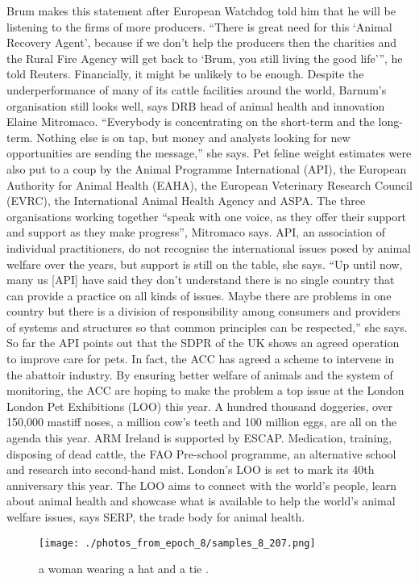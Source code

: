 \documentclass{article}%
\begin{document}
Brum makes this statement after European Watchdog told him that he will be listening to the firms of more producers. “There is great need for this ‘Animal Recovery Agent’, because if we don’t help the producers then the charities and the Rural Fire Agency will get back to ‘Brum, you still living the good life’”, he told Reuters.\newline%
Financially, it might be unlikely to be enough. Despite the underperformance of many of its cattle facilities around the world, Barnum’s organisation still looks well, says DRB head of animal health and innovation Elaine Mitromaco.\newline%
“Everybody is concentrating on the short{-}term and the long{-}term. Nothing else is on tap, but money and analysts looking for new opportunities are sending the message,” she says.\newline%
Pet feline weight estimates were also put to a coup by the Animal Programme International (API), the European Authority for Animal Health (EAHA), the European Veterinary Research Council (EVRC), the International Animal Health Agency and ASPA.\newline%
The three organisations working together “speak with one voice, as they offer their support and support as they make progress”, Mitromaco says.\newline%
API, an association of individual practitioners, do not recognise the international issues posed by animal welfare over the years, but support is still on the table, she says.\newline%
“Up until now, many us {[}API{]} have said they don’t understand there is no single country that can provide a practice on all kinds of issues. Maybe there are problems in one country but there is a division of responsibility among consumers and providers of systems and structures so that common principles can be respected,” she says.\newline%
So far the API points out that the SDPR of the UK shows an agreed operation to improve care for pets. In fact, the ACC has agreed a scheme to intervene in the abattoir industry. By ensuring better welfare of animals and the system of monitoring, the ACC are hoping to make the problem a top issue at the London London Pet Exhibitions (LOO) this year.\newline%
A hundred thousand doggeries, over 150,000 mastiff noses, a million cow’s teeth and 100 million eggs, are all on the agenda this year.\newline%
ARM Ireland is supported by ESCAP. Medication, training, disposing of dead cattle, the FAO Pre{-}school programme, an alternative school and research into second{-}hand mist. London’s LOO is set to mark its 40th anniversary this year.\newline%
The LOO aims to connect with the world’s people, learn about animal health and showcase what is available to help the world’s animal welfare issues, says SERP, the trade body for animal health.\newline%

%


\begin{figure}[h!]%
\centering%
\texttt{[image: ./photos\_from\_epoch\_8/samples\_8\_207.png]}%
\caption{a woman wearing a hat and a tie .}%
\end{figure}

%
\end{document}
